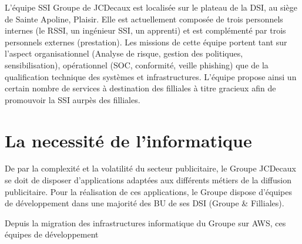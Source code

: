L'équipe \ac{SSI} Groupe de JCDecaux est localisée sur le plateau de la \ac{DSI}, au siège de Sainte Apoline, Plaisir.
Elle est actuellement composée de trois personnels internes (le \ac{RSSI}, un ingénieur \ac{SSI}, un apprenti) et est complémenté 
par trois personnels externes (prestation).
\newpage
Les missions de cette équipe portent tant sur l'aspect organisationnel (Analyse de risque, gestion des politiques, sensibilisation),
opérationnel (SOC, conformité, veille phishing) que de la qualification technique des systèmes et infrastructures. L'équipe propose
ainsi un certain nombre de services à destination des filliales à titre gracieux afin de promouvoir la \ac{SSI} aurpès des filliales.

\section{La necessité de l'informatique}
De par la complexité et la volatilité du secteur publicitaire, le Groupe JCDecaux se doit de disposer d'applications adaptées aux 
différents métiers de la diffusion publicitaire. Pour la réalisation de ces applications, le Groupe dispose d'équipes de développement
dans une majorité des \ac{BU} de ses DSI (Groupe \& Filliales).

Depuis la migration des infrastructures informatique du Groupe sur \ac{AWS}, ces équipes de développement 

